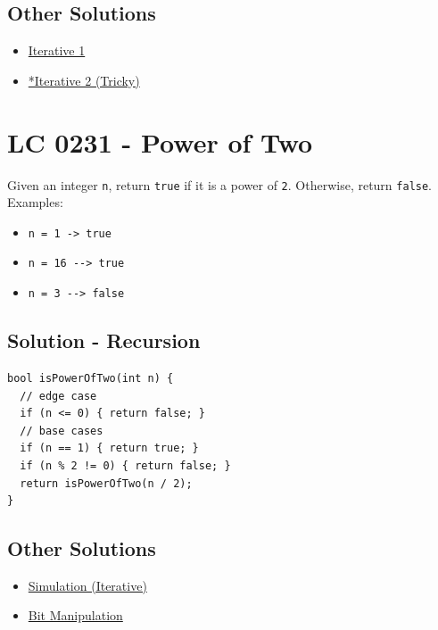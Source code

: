 \subsection*{Other Solutions}
\begin{itemize}
	\item \hyperref[solution:lc0206_iterative1]{Iterative 1}
	\item \hyperref[solution:lc0206_iterative2]{*Iterative 2 (Tricky)}
\end{itemize}

\section{LC 0231 - Power of Two}
Given an integer {\colorbox{CodeBackground}{\lstinline|n|}}, return {\colorbox{CodeBackground}{\lstinline|true|}} if it is a power of {\colorbox{CodeBackground}{\lstinline|2|}}. Otherwise, return {\colorbox{CodeBackground}{\lstinline|false|}}.\\

Examples:
\begin{itemize}
\item {\colorbox{CodeBackground}{\lstinline|n = 1 -> true|}}
\item {\colorbox{CodeBackground}{\lstinline|n = 16 --> true|}}
\item {\colorbox{CodeBackground}{\lstinline|n = 3 --> false|}}
\end{itemize}

\subsection*{Solution - Recursion}\label{solution:lc0231_simulation_recursion}
\begin{lstlisting}
bool isPowerOfTwo(int n) {
  // edge case
  if (n <= 0) { return false; }
  // base cases
  if (n == 1) { return true; }
  if (n % 2 != 0) { return false; }
  return isPowerOfTwo(n / 2);
}
\end{lstlisting}

\subsection*{Other Solutions}
\begin{itemize}
\item \hyperref[solution:lc0231_simulation_iterative]{Simulation (Iterative)}
\item \hyperref[solution:lc0231_bit_manipulation]{Bit Manipulation}
\end{itemize}

